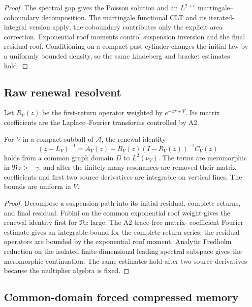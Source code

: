\begin{proof}
The spectral gap gives the Poisson solution and an \(L^{2+\epsilon}\)
martingale--coboundary decomposition.  The martingale functional CLT and its
iterated-integral version apply; the coboundary contributes only the explicit
area correction.  Exponential roof moments control suspension inversion and
the final residual roof.  Conditioning on a compact past cylinder changes the
initial law by a uniformly bounded density, so the same Lindeberg and bracket
estimates hold.
\end{proof}

\subsection{Raw renewal resolvent}

Let \(R_V(z)\) be the first-return operator weighted by
\(e^{-z\tau+V}\).  Its matrix coefficients are the Laplace--Fourier transforms
controlled by A2.

\begin{theorem}
\label{thm:r17-a4-renewal}
For \(V\) in a compact subball of \(\mathcal A\), the renewal identity
\[
 (z-L_V)^{-1}=A_V(z)+B_V(z)(I-R_V(z))^{-1}C_V(z)
\]
holds from a common graph domain \(D\) to \(L^2(\nu_V)\).  The terms are
meromorphic in \(\Re z>-\gamma\), and after the finitely many resonances are
removed their matrix coefficients and first two source derivatives are
integrable on vertical lines.  The bounds are uniform in \(V\).
\end{theorem}

\begin{proof}
Decompose a suspension path into its initial residual, complete returns, and
final residual.  Fubini on the common exponential roof weight gives the
renewal identity first for \(\Re z\) large.  The A2 trace-free matrix-
coefficient Fourier estimate gives an integrable bound for the complete-return
series; the residual operators are bounded by the exponential roof moment.
Analytic Fredholm reduction on the isolated finite-dimensional leading
spectral subspace gives the meromorphic continuation.  The same estimates
hold after two source derivatives because the multiplier algebra is fixed.
\end{proof}

\subsection{Common-domain forced compressed memory}

